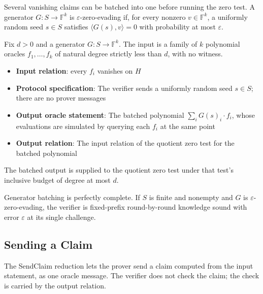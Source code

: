 Several vanishing claims can be batched into one before running the zero test. A generator $G : S \to \mathbb{F}^k$ is $\varepsilon$-zero-evading if, for every nonzero $v \in \mathbb{F}^k$, a uniformly random seed $s \in S$ satisfies $\langle G(s), v \rangle = 0$ with probability at most $\varepsilon$.

\begin{definition}
    \label{def:generator_batch}
    Fix $d > 0$ and a generator $G : S \to \mathbb{F}^k$. The input is a family of $k$ polynomial oracles $f_1, \ldots, f_k$ of natural degree strictly less than $d$, with no witness.
    \begin{itemize}
        \item \textbf{Input relation}: every $f_i$ vanishes on $H$
        \item \textbf{Protocol specification}: The verifier sends a uniformly random seed $s \in S$; there are no prover messages
        \item \textbf{Output oracle statement}: The batched polynomial $\sum_{i} G(s)_i \cdot f_i$, whose evaluations are simulated by querying each $f_i$ at the same point
        \item \textbf{Output relation}: The input relation of the quotient zero test for the batched polynomial
    \end{itemize}
    The batched output is supplied to the quotient zero test under that test's inclusive budget of
    degree at most $d$.
    \leanok
\end{definition}

\begin{theorem}
    Generator batching is perfectly complete. If $S$ is finite and nonempty and $G$ is $\varepsilon$-zero-evading, the verifier is fixed-prefix round-by-round knowledge sound with error $\varepsilon$ at its single challenge.
    \leanok
\end{theorem}

\subsection{Sending a Claim}

The SendClaim reduction lets the prover send a claim computed from the input statement, as one oracle message. The verifier does not check the claim; the check is carried by the output relation.

